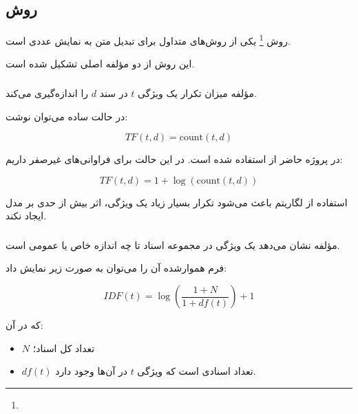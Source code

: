 \subsection{روش }

روش
\footnote{}
یکی از روش‌های متداول برای تبدیل متن به نمایش عددی است.

این روش از دو مؤلفه اصلی تشکیل شده است.


\subsubsection{}

مؤلفه
میزان تکرار یک ویژگی $t$ در سند $d$ را اندازه‌گیری می‌کند.

در حالت ساده می‌توان نوشت:

\begin{equation}
TF(t,d)=\mathrm{count}(t,d)
\end{equation}

در پروژه حاضر از
استفاده شده است. در این حالت برای فراوانی‌های غیرصفر داریم:

\begin{equation}
TF(t,d)=1+\log(\mathrm{count}(t,d))
\end{equation}

استفاده از لگاریتم باعث می‌شود تکرار بسیار زیاد یک ویژگی، اثر بیش از حدی بر مدل ایجاد نکند.


\subsubsection{}

مؤلفه
نشان می‌دهد یک ویژگی در مجموعه اسناد تا چه اندازه خاص یا عمومی است.

فرم هموارشده آن را می‌توان به صورت زیر نمایش داد:

\begin{equation}
IDF(t)
=
\log
\left(
\frac{1+N}{1+df(t)}
\right)
+1
\end{equation}

که در آن:

\begin{itemize}
	\item $N$ تعداد کل اسناد؛
	\item $df(t)$ تعداد اسنادی است که ویژگی $t$ در آن‌ها وجود دارد.
\end{itemize}

